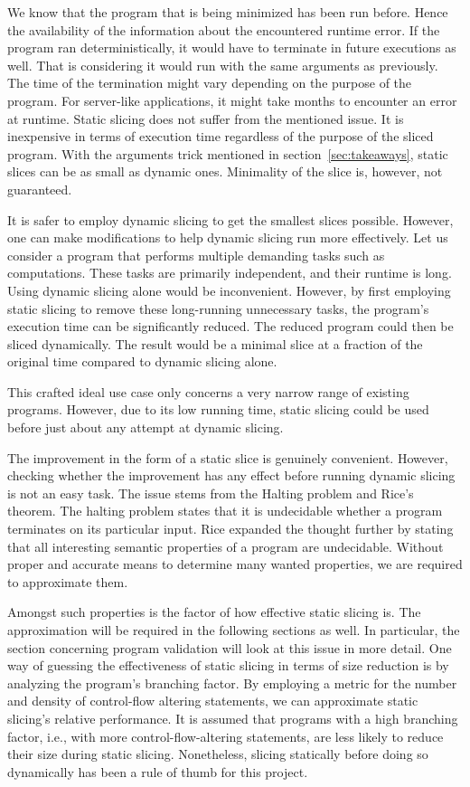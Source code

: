 We know that the program that is being minimized has been run before.
Hence the availability of the information about the encountered runtime 
error.
If the program ran deterministically, it would have to terminate in future 
executions as well.
That is considering it would run with the same arguments as previously.
The time of the termination might vary depending on the purpose of 
the program.
For server-like applications, it might take months to encounter an error 
at runtime.
Static slicing does not suffer from the mentioned issue.
It is inexpensive in terms of execution time regardless of the purpose 
of the sliced program.
With the arguments trick mentioned in section~\ref{sec:takeaways}, 
static slices can be as small as dynamic ones.
Minimality of the slice is, however, not guaranteed.

It is safer to employ dynamic slicing to get the smallest slices possible.
However, one can make modifications to help dynamic slicing run more 
effectively.
Let us consider a program that performs multiple demanding tasks 
such as computations.
These tasks are primarily independent, and their runtime is long.
Using dynamic slicing alone would be inconvenient.
However, by first employing static slicing to remove these long-running 
unnecessary tasks, the program's execution time can be significantly reduced.
The reduced program could then be sliced dynamically.
The result would be a minimal slice at a fraction of the original time 
compared to dynamic slicing alone.

This crafted ideal use case only concerns a very narrow range of existing 
programs.
However, due to its low running time, static slicing could be used before 
just about any attempt at dynamic slicing.


The improvement in the form of a static slice is genuinely convenient.
However, checking whether the improvement has any effect before running 
dynamic slicing is not an easy task.
The issue stems from the Halting problem and Rice's theorem.
The halting problem states that it is undecidable whether a program 
terminates on its particular input.
Rice expanded the thought further by stating that all interesting semantic 
properties of a program are undecidable.
Without proper and accurate means to determine many wanted properties, 
we are required to approximate them.

Amongst such properties is the factor of how effective static slicing is.
The approximation will be required in the following sections as well.
In particular, the section concerning program validation will look at this 
issue in more detail.
One way of guessing the effectiveness of static slicing in terms of size 
reduction is by analyzing the program's branching factor.
By employing a metric for the number and density of control-flow altering 
statements, we can approximate static slicing's relative performance.
It is assumed that programs with a high branching factor, i.e., with more 
control-flow-altering statements, are less likely to reduce their size 
during static slicing.
Nonetheless, slicing statically before doing so dynamically has been 
a rule of thumb for this project.

